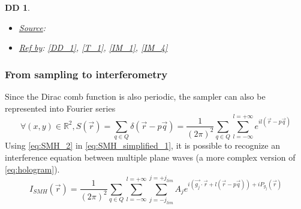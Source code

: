 \documentclass[12pt]{article}
\newtheorem{DD}{DD}
\begin{document}
\begin{DD}
\begin{itemize}
\begin{equation}
\begin{gathered}
\end{gathered}
\label{eq:SMH_FT}
\end{equation}
Therefore it is possible to restrain the calculation of $\widetilde{I}_{SMH}$ for $\vec{\nu} \in [-\frac{1}{2p},\frac{1}{2p}]^{2}=\Gamma$ and respect assumption \cref{A_2}. Nevertheless, \cref{eq:SMH_simplified_1} has still an infinite set of terms in the sum since the set Q is not finite. Therefore, \cref{eq:SMH_simplified_1}, at this stage, is not unusable. Applying \cref{A_1}, $\forall (\nu_x,\nu_y) \notin [-g_{lim},g_{lim}]^2, \widetilde{I}_{C}(\nu_x,\nu_y)=0$. As a consequence, $\exists (N_{lim},N_{lim})\in \mathbb{N}^2 / \ \forall (\nu_x,\nu_y) \in \Gamma, \ \widetilde{I}_{C}(\nu_x-\frac{_{lim}}{p},\nu_y-\frac{_{lim}}{p})=0$. It is possible thus to define $Q_{lim}=\{\forall (n,m) \in \mathbb{Z}^{2}\cap[-N_{lim},N_{lim}], \vec{q}=n\vec{u_x}+m\vec{u_y}\}$ and  rewrite \cref{eq:SMH_FT} as the following:
\begin{equation}
\begin{gathered}
\forall (\nu_x,\nu_y) \in \Gamma, \widetilde{I}_{SMH}(\nu_x,\nu_y)=\frac{1}{p^2}\sum_{n=-N_{lim}}^{n=+N_{lim}}\sum_{m=-N_{lim}}^{m=+N_{lim}}\widetilde{I}_{C}(\nu_x-\frac{n}{p},\nu_y-\frac{m}{p}) \\
\forall \vec{\nu} \in \Gamma, \widetilde{I}_{SMH}(\vec{\nu})=\frac{1}{p^2}\sum_{\vec{q}\in Q_{lim}}\widetilde{I}_{C}(\vec{\nu}-\frac{\vec{q}}{p})
\end{gathered}
\label{eq:SMH_FT_complete}
\end{equation}
\item \underline{Source}: \cite{Pofelski2017}
\item \underline{Ref by}: \cref{DD_1}, \cref{T_1}, \cref{IM_1}, \cref{IM_4}
\end{itemize}
\end{DD}

\subsubsection*{From sampling to interferometry}

Since the Dirac comb function is also periodic, the sampler can also be represented into Fourier series
\begin{equation}
\forall (x,y) \in \mathbb{R}^{2}, S(\vec{r})=\sum_{q\in Q}\delta(\vec{r}-p\vec{q}) = \frac{1}{(2\pi)^2}\sum_{q\in Q}\sum_{l=-\infty}^{l=+\infty}e^{il(\vec{r}-p\vec{q})}
\label{eq:SMH_2}
\end{equation}
Using \cref{eq:SMH_2} in \cref{eq:SMH_simplified_1}, it is possible to recognize an interference equation between multiple plane waves (a more complex version of \cref{eq:hologram}).
\begin{equation}
I_{SMH}(\vec{r})=\frac{1}{(2\pi)^2}\sum_{q\in Q}\sum_{l=-\infty}^{l=+\infty}\sum_{j=-j_{lim}}^{j=+j_{lim}}A_je^{i(\vec{g_j}\cdot\vec{r}+l(\vec{r}-p\vec{q}))+iP_{g_{j}}(\vec{r})}
\label{eq:SMH_3}
\end{equation}
\end{document}
